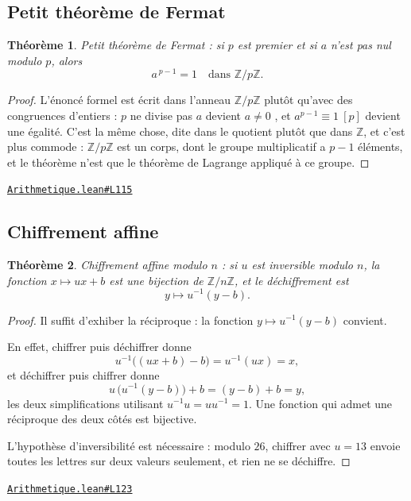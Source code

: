\documentclass[11pt,a4paper]{article}
\theoremstyle{definition}
\theoremstyle{plain}
\newtheorem{theoreme}{Théorème}
\newcommand{\source}[2]{\par\smallskip\noindent\hfill{\footnotesize\href{#1}{\texttt{#2}}}\par\smallskip}
\begin{document}
\subsection{Petit théorème de Fermat}

\begin{theoreme}
Petit théorème de Fermat : si $p$ est premier et si $a$ n'est pas nul modulo $p$, alors
\[ a^{\,p-1} = 1 \quad \text{dans } \mathbb{Z}/p\mathbb{Z} . \]
\end{theoreme}

\begin{proof}
L'énoncé formel est écrit dans l'anneau $\mathbb{Z}/p\mathbb{Z}$ plutôt qu'avec des congruences d'entiers : \og{} $p$ ne divise
pas $a$ \fg{} devient \og{} $a \ne 0$ \fg{}, et \og{} $a^{p-1} \equiv 1 \ [p]$ \fg{}
devient une égalité. C'est la même chose, dite dans le quotient plutôt que dans
$\mathbb{Z}$, et c'est plus commode : $\mathbb{Z}/p\mathbb{Z}$ est un corps, dont le groupe
multiplicatif a $p - 1$ éléments, et le théorème n'est que le théorème de Lagrange
appliqué à ce groupe.
\end{proof}
\source{https://github.com/Commutator-IO/learn-lean/blob/main/courses/02-lycee/10-specialite-mathematiques-terminale-s/Arithmetique.lean\#L115}{Arithmetique.lean\#L115}

\subsection{Chiffrement affine}

\begin{theoreme}
Chiffrement affine modulo $n$ : si $u$ est inversible modulo $n$, la fonction
$x \mapsto ux + b$ est une bijection de $\mathbb{Z}/n\mathbb{Z}$, et le déchiffrement est
\[ y \mapsto u^{-1}(y - b) . \]
\end{theoreme}

\begin{proof}
Il suffit d'exhiber la réciproque : la fonction $y \mapsto u^{-1}(y - b)$ convient.

En effet, chiffrer puis déchiffrer donne
\[ u^{-1}\bigl((ux + b) - b\bigr) = u^{-1}(ux) = x , \]
et déchiffrer puis chiffrer donne
\[ u\,\bigl(u^{-1}(y - b)\bigr) + b = (y - b) + b = y , \]
les deux simplifications utilisant $u^{-1}u = uu^{-1} = 1$. Une fonction qui admet une
réciproque des deux côtés est bijective.

\medskip\noindent
L'hypothèse d'inversibilité est nécessaire : modulo $26$, chiffrer avec $u = 13$ envoie
toutes les lettres sur deux valeurs seulement, et rien ne se déchiffre.
\end{proof}
\source{https://github.com/Commutator-IO/learn-lean/blob/main/courses/02-lycee/10-specialite-mathematiques-terminale-s/Arithmetique.lean\#L123}{Arithmetique.lean\#L123}
\end{document}
